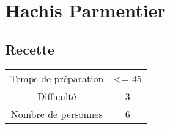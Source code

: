 \newpage
\section{Hachis Parmentier}
    \label{sec:Hachis Parmentier}
    \subsection{Recette}
    \vspace{1cm}


    \begin{center}
        \begin{tabular}{c|c}
            Temps de préparation & <= 45 \\
            Difficulté & 3 \\
            Nombre de personnes & 6 
        \end{tabular}
    \end{center}{}

    \vspace{1cm}
    \hline
    \vspace{1cm}

